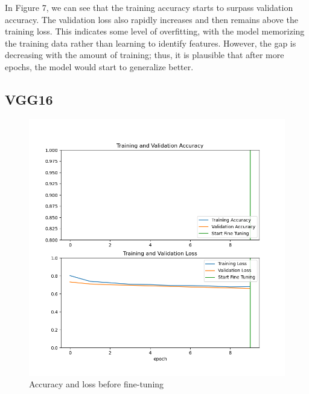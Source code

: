 \documentclass[letterpaper]{article} %
\begin{document}
In Figure 7, we can see that the training accuracy starts to surpass validation accuracy. The validation loss also rapidly increases and then remains above the training loss. This indicates some level of overfitting, with the model memorizing the training data rather than learning to identify features. However, the gap is decreasing with the amount of training; thus, it is plausible that after more epochs, the model would start to generalize better. 

\subsection{VGG16}

\begin{figure}[h!]
    \centering
    \begin{minipage}{0.2\textwidth}
        \centering
        \includegraphics[width=\textwidth]{vgg16_acc_loss_1.png}
        \caption{Accuracy and loss before fine-tuning}
        \label{fig:fig1}
    \end{minipage}
    \hfill
    \begin{minipage}{0.2\textwidth}
        \centering

\end{minipage}
\end{figure}
\end{document}

